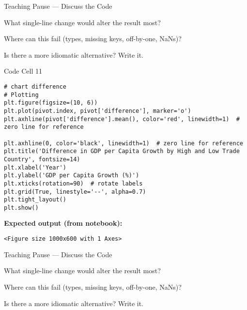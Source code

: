 \documentclass[notes,11pt, aspectratio=169, xcolor=table]{beamer}
\newenvironment{wideitemize}{\itemize\addtolength{\itemsep}{10pt}}{\enditemize}
\begin{document}
\begin{frame}{Teaching Pause — Discuss the Code}
\begin{wideitemize}
\item What single-line change would alter the result most?
\item Where can this fail (types, missing keys, off-by-one, NaNs)?
\item Is there a more idiomatic alternative? Write it.
\end{wideitemize}
\end{frame}

\begin{frame}[fragile]{Code Cell 11}
\begin{verbatim}
# chart difference
# Plotting
plt.figure(figsize=(10, 6))
plt.plot(pivot.index, pivot['difference'], marker='o')
plt.axhline(pivot['difference'].mean(), color='red', linewidth=1)  # zero line for reference

plt.axhline(0, color='black', linewidth=1)  # zero line for reference
plt.title('Difference in GDP per Capita Growth by High and Low Trade Country', fontsize=14)
plt.xlabel('Year')
plt.ylabel('GDP per Capita Growth (%)')
plt.xticks(rotation=90)  # rotate labels
plt.grid(True, linestyle='--', alpha=0.7)
plt.tight_layout()
plt.show()
\end{verbatim}
\vspace{0.5ex}
\textbf{Expected output (from notebook):}
\begin{verbatim}
<Figure size 1000x600 with 1 Axes>
\end{verbatim}
\end{frame}

\begin{frame}{Teaching Pause — Discuss the Code}
\begin{wideitemize}
\item What single-line change would alter the result most?
\item Where can this fail (types, missing keys, off-by-one, NaNs)?
\item Is there a more idiomatic alternative? Write it.
\end{wideitemize}
\end{frame}
\end{document}
